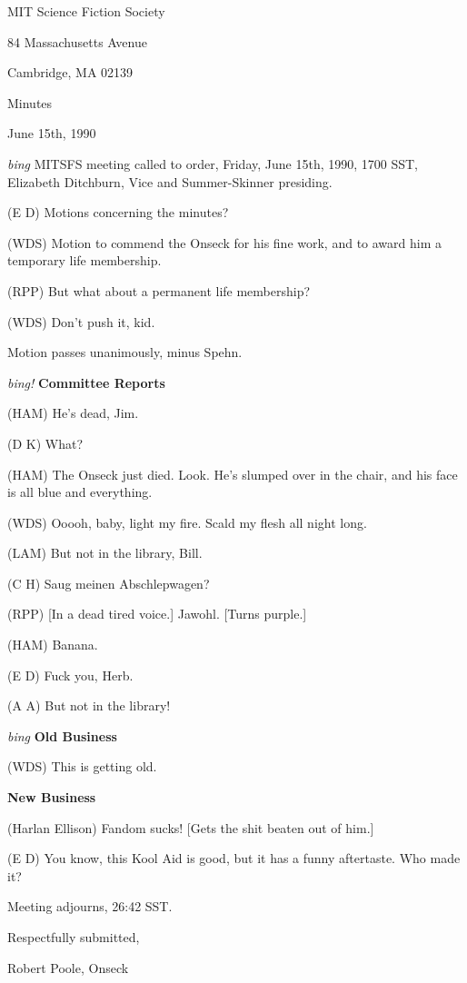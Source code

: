 \setlength{\topmargin}{-0.5in}
\setlength{\oddsidemargin}{0.0in}
\setlength{\evensidemargin}{0.0in}
\setlength{\textheight}{9in}
\setlength{\textwidth}{6.5in}



\begin{center}
MIT Science Fiction Society

84 Massachusetts Avenue

Cambridge, MA 02139

\vspace{0.2in}
Minutes

June 15th, 1990

\end{center}
 
\vspace{0.15in}
{\em bing\/}  MITSFS meeting called to order, Friday, June 15th, 1990,
1700 SST, Elizabeth Ditchburn, Vice and Summer-Skinner presiding.

(E D) Motions concerning the minutes?

(WDS) Motion to commend the Onseck for his fine work, and to award him a
temporary life membership.

(RPP) But what about a permanent life membership?

(WDS) Don't push it, kid.

Motion passes unanimously, minus Spehn.

\vspace{.15in}
{\em bing!\/}  {\bf Committee Reports\/}

(HAM) He's dead, Jim.

(D K) What?

(HAM) The Onseck just died.  Look.  He's slumped over in the chair, and his
face is all blue and everything.

(WDS) Ooooh, baby, light my fire.  Scald my flesh all night long.

(LAM) But not in the library, Bill.

(C H) Saug meinen Abschlepwagen?

(RPP) [In a dead tired voice.] Jawohl.  [Turns purple.]

(HAM) Banana.

(E D) Fuck you, Herb.

(A A) But not in the library!

\vspace{.15in}
{\em bing\/} {\bf Old Business\/}

(WDS) This is getting old.

\vspace{0.15in}
{\bf New Business\/}

(Harlan Ellison) Fandom sucks!  [Gets the shit beaten out of him.]

(E D) You know, this Kool Aid is good, but it has a funny aftertaste.  Who
made it?

Meeting adjourns, 26:42 SST.

\vspace{0.15in}
\begin{center}
Respectfully submitted,

Robert Poole, Onseck
\end{center}

